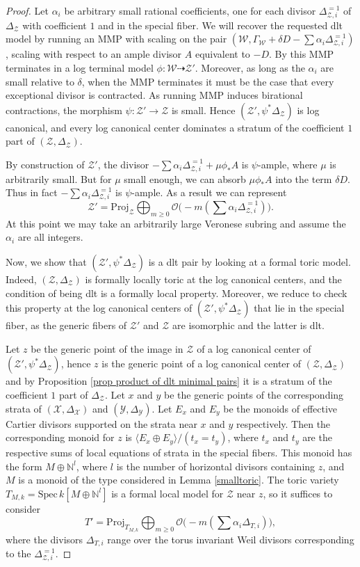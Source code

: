 \documentclass{amsart}%
\numberwithin{equation}{subsection}
\theoremstyle{plain2}
\theoremstyle{definition2}
\theoremstyle{stepstyle}
\theoremstyle{point}
\theoremstyle{subpoint}
\newcommand{\cX}{\ensuremath{\mathscr{X}}}
\newcommand{\cY}{\ensuremath{\mathscr{Y}}}
\newcommand{\cZ}{\ensuremath{\mathscr{Z}}}
\newcommand{\cW}{\ensuremath{\mathscr{W}}}
\renewcommand{\cY}{\ensuremath{\mathscr{Y}}}
\newcommand{\Spec}{\ensuremath{\mathrm{Spec}\,}}
\begin{document}
\begin{proof}
Let $\alpha_i$ be arbitrary small rational coefficients, one for each divisor $\Delta_{\cZ,i}^{=1}$ of $\Delta_\cZ$ with coefficient $1$ and in the special fiber. We will recover the requested dlt model by running an MMP with scaling on the pair $(\cW, \Gamma_\cW+\delta D - \sum \alpha_i \Delta_{\cZ,i}^{=1})$, scaling with respect to an ample divisor $A$ equivalent to $-D$. By \cite{BirkarCasciniHaconEtAl} this MMP terminates in a log terminal model $\phi \colon \cW \dashrightarrow \cZ'$. Moreover, as long as the $\alpha_i$ are small relative to $\delta$, when the MMP terminates it must be the case that every exceptional divisor is contracted.  As running MMP induces birational contractions, the morphism $\psi \colon \cZ' \to \cZ$ is small. Hence $(\cZ', \psi^*\Delta_\cZ)$ is log canonical, and every log canonical center dominates a stratum of the coefficient $1$ part of $(\cZ,\Delta_\cZ)$.

By construction of $\cZ'$, the divisor $-\sum \alpha_i \Delta_{\cZ,i}^{=1} + \mu \phi_* A$ is $\psi$-ample, where $\mu$ is arbitrarily small. But for $\mu$ small enough, we can absorb $\mu \phi_* A$ into the term $\delta D$. Thus in fact $-\sum \alpha_i \Delta_{\cZ,i}^{=1}$ is $\psi$-ample. As a result we can represent $$\cZ' = \text{Proj}_\cZ \bigoplus_{m \geqslant 0} \mathcal{O}\big(-m(\sum \alpha_i \Delta_{\cZ,i}^{=1})\big).$$ At this point we may take an arbitrarily large Veronese subring and assume the $\alpha_i$ are all integers.

Now, we show that $(\cZ', \psi^*\Delta_\cZ)$ is a dlt pair %
by looking at a formal toric model. Indeed, $(\cZ,\Delta_{\cZ})$ is formally locally toric at the log canonical centers, and the condition of being dlt is a formally local property. Moreover, we reduce to check this property at the log canonical centers of  $(\cZ', \psi^*\Delta_\cZ)$ that lie in the special fiber, as the generic fibers of $\cZ'$ and $\cZ$ are isomorphic and the latter is dlt.

Let $z$ be the generic point of the image in $\cZ$ of a log canonical center of $(\cZ', \psi^*\Delta_\cZ)$, hence $z$ is the generic point of a log canonical center of $(\cZ,\Delta_{\cZ})$ and by Proposition \ref{prop product of dlt minimal pairs} it is a stratum of the coefficient $1$ part of $\Delta_{\cZ}$. Let $x$ and $y$ be the generic points of the corresponding strata of $(\cX,\Delta_\cX)$ and $(\cY, \Delta_\cY)$. Let $E_x$ and $E_y$ be the monoids of effective Cartier divisors supported on the strata near $x$ and $y$ respectively. Then the corresponding monoid for $z$ is $\langle E_x \oplus E_y \rangle /(t_x=t_y)$, where $t_x$ and $t_y$ are the respective sums of local equations of strata in the special fibers. This monoid has the form $M \oplus \mathbb{N}^l$, where $l$ is the number of horizontal divisors containing $z$, and $M$ is a monoid of the type considered in Lemma \ref{smalltoric}. The toric variety $T_{M,k}=\Spec k[M \oplus \mathbb{N}^l]$ is a formal local model for $\cZ$ near $z$, so it suffices to consider $$T'=\text{Proj}_{T_{M,k}} \bigoplus_{m \geqslant 0} \mathcal{O}\big(-m(\sum \alpha_i \Delta_{T,i})\big),$$ where the divisors $\Delta_{T,i}$ range over the torus invariant Weil divisors corresponding to the $\Delta_{\cZ,i}^{=1}$.


\end{proof}
\end{document}
